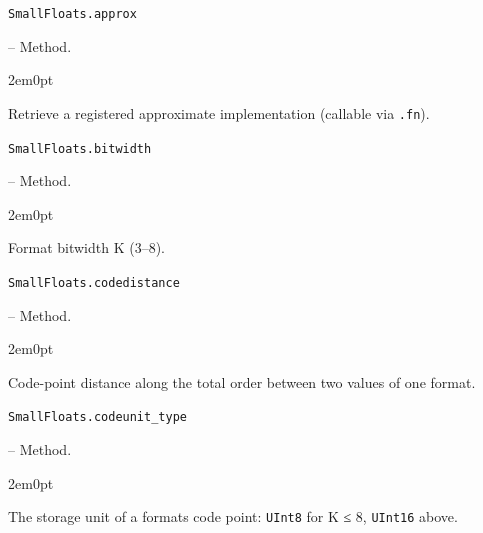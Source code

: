 \par\medskip\noindent\begin{minipage}{\linewidth}
\hypertarget{9294149665862826323}{\texttt{SmallFloats.approx}}  -- {Method.}
\nopagebreak
\begin{adjustwidth}{2em}{0pt}

Retrieve a registered approximate implementation (callable via \texttt{.fn}).



\end{adjustwidth}
\end{minipage}
\par\medskip

\par\medskip\noindent\begin{minipage}{\linewidth}
\hypertarget{15155075425824800578}{\texttt{SmallFloats.bitwidth}}  -- {Method.}
\nopagebreak
\begin{adjustwidth}{2em}{0pt}

Format bitwidth K (3–8).



\end{adjustwidth}
\end{minipage}
\par\medskip

\par\medskip\noindent\begin{minipage}{\linewidth}
\hypertarget{9130444423673118751}{\texttt{SmallFloats.codedistance}}  -- {Method.}
\nopagebreak
\begin{adjustwidth}{2em}{0pt}

Code-point distance along the total order between two values of one format.



\end{adjustwidth}
\end{minipage}
\par\medskip

\par\medskip\noindent\begin{minipage}{\linewidth}
\hypertarget{16705531398006417767}{\texttt{SmallFloats.codeunit\_\allowbreak{}type}}  -- {Method.}
\nopagebreak
\begin{adjustwidth}{2em}{0pt}

The storage unit of a format{\textquotesingle}s code point: \texttt{UInt8} for K ≤ 8, \texttt{UInt16} above.



\end{adjustwidth}
\end{minipage}
\par\medskip

